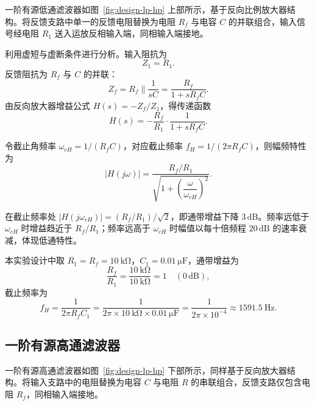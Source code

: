 \documentclass[12pt]{ctexart}
\begin{document}
一阶有源低通滤波器如图~\ref{fig:design-lp-hp} 上部所示，基于反向比例放大器结构。将反馈支路中单一的反馈电阻替换为电阻 $R_f$ 与电容 $C$ 的并联组合，输入信号经电阻 $R_1$ 送入运放反相输入端，同相输入端接地。

利用虚短与虚断条件进行分析。输入阻抗为
\begin{equation}
    Z_1 = R_1.
\end{equation}
反馈阻抗为 $R_f$ 与 $C$ 的并联：
\begin{equation}
    Z_f = R_f \parallel \frac{1}{sC} = \frac{R_f}{1 + sR_fC}.
\end{equation}
由反向放大器增益公式 $H(s) = -Z_f / Z_1$，得传递函数
\begin{equation}
    H(s) = -\frac{R_f}{R_1} \cdot \frac{1}{1 + sR_fC}.
    \label{eq:lp-tf}
\end{equation}

令截止角频率 $\omega_{cH} = 1/(R_fC)$，对应截止频率 $f_H = 1/(2\pi R_fC)$，则幅频特性为
\begin{equation}
    |H(j\omega)| = \frac{R_f / R_1}{\sqrt{1 + \left(\dfrac{\omega}{\omega_{cH}}\right)^{\!2}}}.
    \label{eq:lp-mag}
\end{equation}

在截止频率处 $|H(j\omega_{cH})| = (R_f/R_1)/\sqrt{2}$，即通带增益下降 $3\,\mathrm{dB}$。频率远低于 $\omega_{cH}$ 时增益趋近于 $R_f/R_1$；频率远高于 $\omega_{cH}$ 时幅值以每十倍频程 $20\,\mathrm{dB}$ 的速率衰减，体现低通特性。

本实验设计中取 $R_1 = R_f = \SI{10}{\kilo\ohm}$，$C_1 = \SI{0.01}{\micro\farad}$，通带增益为
\begin{equation}
    \frac{R_f}{R_1} = \frac{\SI{10}{\kilo\ohm}}{\SI{10}{\kilo\ohm}} = 1 \quad (0\,\mathrm{dB}),
\end{equation}
截止频率为
\begin{equation}
    f_H = \frac{1}{2\pi R_f C_1}
        = \frac{1}{2\pi \times \SI{10}{\kilo\ohm} \times \SI{0.01}{\micro\farad}}
        = \frac{1}{2\pi \times 10^{-4}}
        \approx \SI{1591.5}{\hertz}.
    \label{eq:lp-fc}
\end{equation}

\subsection{一阶有源高通滤波器}

一阶有源高通滤波器如图~\ref{fig:design-lp-hp} 下部所示，同样基于反向放大器结构。将输入支路中的电阻替换为电容 $C$ 与电阻 $R$ 的串联组合，反馈支路仅包含电阻 $R_f$，同相输入端接地。
\end{document}

